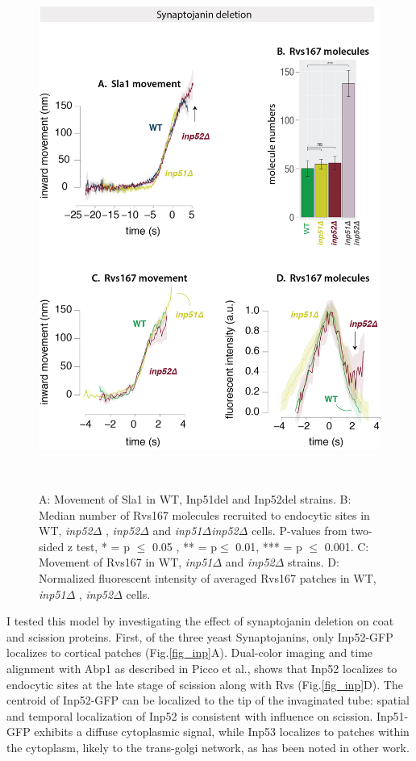 		\begin{figure}
		\centering
		\includegraphics[width=17cm,height=17cm,keepaspectratio]{figures/results_final/inp_movement3}
		\caption[Syanptojanin-like proteins in yeast]
		{A: Movement of Sla1 in WT, Inp51del and Inp52del strains. 
		B: Median number of Rvs167 molecules recruited to endocytic sites in WT, \textit{inp52$\Delta$ }, \textit{inp52$\Delta$ } and \textit{inp51$\Delta$inp52$\Delta$ } cells. P-values from two-sided z test,  * = p $\leq$ 0.05 , ** = p$\leq$ 0.01, *** = p $\leq$ 0.001.  
		C: Movement of Rvs167 in WT, \textit{inp51$\Delta$ } and \textit{inp52$\Delta$ } strains. 
		D: Normalized fluorescent intensity of averaged Rvs167 patches in WT, \textit{inp51$\Delta$ }, \textit{inp52$\Delta$ } cells.
		\label{fig_inpdel}}
		\end{figure}		

	\vspace{5mm}
	I tested this model by investigating the effect of synaptojanin deletion on coat and scission proteins. First, of the three yeast Synaptojanins, only Inp52-GFP localizes to cortical patches (Fig.\ref{fig_inp}A). Dual-color imaging and time alignment with Abp1 as described in Picco et al., shows that Inp52 localizes to endocytic sites at the late stage of scission along with Rvs (Fig.\ref{fig_inp}D). The centroid of Inp52-GFP can be localized to the tip of the invaginated tube: spatial and temporal localization of Inp52 is consistent with influence on scission. Inp51-GFP exhibits a diffuse cytoplasmic signal, while Inp53 localizes to patches within the cytoplasm, likely to the trans-golgi network, as has been noted in other work. 


